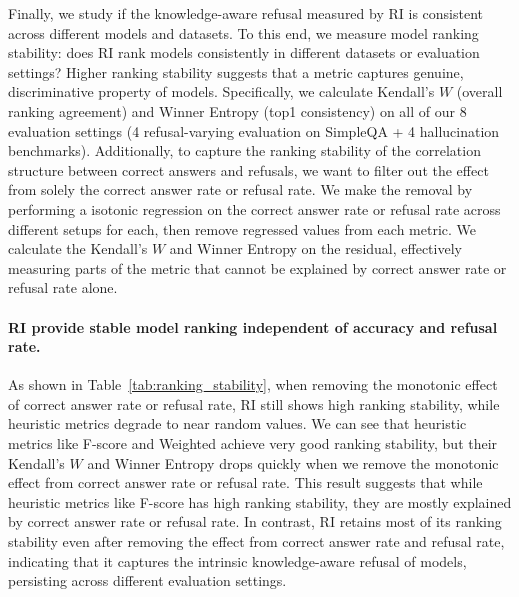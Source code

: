 \documentclass{article} %
\theoremstyle{definition}
\begin{document}
Finally, we study if the knowledge-aware refusal measured by RI is consistent across different models and datasets. 
To this end, we measure model ranking stability: does RI rank models consistently in different datasets or evaluation settings? 
Higher ranking stability suggests that a metric captures genuine, discriminative property of models. 
Specifically, we calculate Kendall's $W$ (overall ranking agreement) and Winner Entropy (top1 consistency) on all of our 8 evaluation settings (4 refusal-varying evaluation on SimpleQA + 4 hallucination benchmarks). 
Additionally, to capture the ranking stability of the correlation structure between correct answers and refusals, we want to filter out the effect from solely the correct answer rate or refusal rate. 
We make the removal by performing a isotonic regression on the correct answer rate or refusal rate across different setups for each, then remove regressed values from each metric. We calculate the Kendall's $W$ and Winner Entropy on the residual, effectively measuring parts of the metric that cannot be explained by correct answer rate or refusal rate alone.

\paragraph{RI provide stable model ranking independent of accuracy and refusal rate.} 
As shown in Table~\ref{tab:ranking_stability}, when removing the monotonic effect of correct answer rate or refusal rate, RI still shows high ranking stability, while heuristic metrics degrade to near random values. 
We can see that heuristic metrics like F-score and Weighted achieve very good ranking stability, but their Kendall's $W$ and Winner Entropy drops quickly when we remove the monotonic effect from correct answer rate or refusal rate. 
This result suggests that while heuristic metrics like F-score has high ranking stability, they are mostly explained by correct answer rate or refusal rate. 
In contrast, RI retains most of its ranking stability even after removing the effect from correct answer rate and refusal rate, indicating that it captures the intrinsic knowledge-aware refusal of models, persisting across different evaluation settings.
\end{document}
